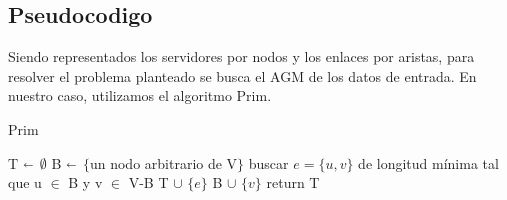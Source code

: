 \subsection{Pseudocodigo}

Siendo representados los servidores por nodos y los enlaces por aristas, para resolver el problema planteado se busca el AGM de los datos de entrada. En nuestro caso, utilizamos el algoritmo Prim.


\begin{algorithm}[H]
\caption{Prim}\label{ej1}
\begin{algorithmic}[1]
	\State T  $\shortleftarrow$ $\emptyset$
	\State B $\shortleftarrow$ $\{$un nodo arbitrario de V$\}$
		\State buscar $e=\{u,v\}$ de longitud mínima tal que u $\in$ B y v $\in$ V-B
		\State T $\cup$ $\{e\}$
		\State B $\cup$ $\{v\}$
	\EndWhile
	\State return T
\EndProcedure
\end{algorithmic}
\end{algorithm}




